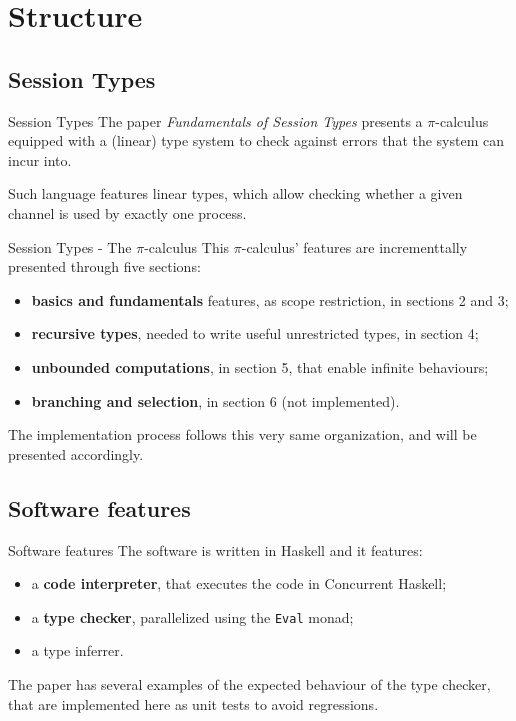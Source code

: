 \section{Structure}

\subsection*{Session Types}

\begin{frame}{Session Types}
    The paper \emph{Fundamentals of Session Types} %
    presents a $\pi$-calculus equipped with a (linear) type system to check against errors that the system can incur into.

    Such language features linear types, which allow checking whether a given channel is used by exactly one process.
\end{frame}

\begin{frame}{Session Types - The $\pi$-calculus}
    This $\pi$-calculus' features are incrementtally presented through five sections:
    \begin{itemize}
        \item \textbf{basics and fundamentals} features, as scope restriction, in sections 2 and 3;
        \item \textbf{recursive types}, needed to write useful unrestricted types, in section 4;
        \item \textbf{unbounded computations}, in section 5, that enable infinite behaviours;
        \item \textbf{branching and selection}, in section 6 (not implemented).
    \end{itemize}

    The implementation process follows this very same organization, and will be presented accordingly.
\end{frame}

\subsection*{Software features}

\begin{frame}{Software features}
    The software is written in Haskell and it features:
    \begin{itemize}
        \item a \textbf{code interpreter}, that executes the code in Concurrent Haskell;
        \item a \textbf{type checker}, parallelized using the \texttt{Eval} monad;
        \item a type inferrer.
    \end{itemize}

    The paper has several examples of the expected behaviour of the type checker, that are implemented here as unit tests to avoid regressions.
\end{frame}



